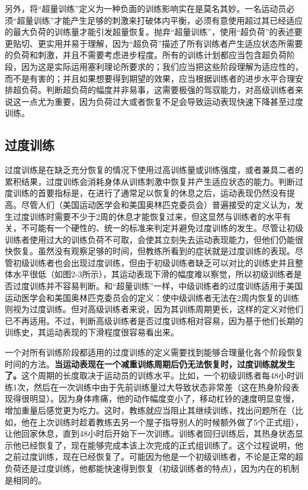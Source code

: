 另外，将“超量训练”定义为一种负面的训练影响实在是莫名其妙。一名运动员必须“超量训练”才能产生足够的刺激来打破体内平衡，必须有意使用超过其已经适应的最大负荷的训练量才能引发超量恢复。抛弃“超量训练”，使用“超负荷”的表述要更贴切、更实用并易于理解，因为“超负荷”描述了所有训练者产生适应状态所需要的负荷和刺激，并且不需要考虑进步程度。所有的训练计划都应当包含超负荷阶段，因为这是实际运用塞利理论所要求的；我们应当把这些阶段理解为适应性的，而不是有害的；并且如果想要得到期望的效果，应当根据训练者的进步水平合理安排超负荷。判断超负荷的幅度并非易事，这需要极强的驾驭能力，对高级训练者来说这一点尤为重要，因为负荷过大或者恢复不足会导致运动表现快速下降甚至过度训练。

\subsection{过度训练}

过度训练是在缺乏充分恢复的情况下使用过高训练量或训练强度，或者兼具二者的累积结果，过度训练会消耗身体从训练刺激中恢复并产生适应状态的能力。判断过度训练的首要指标是，在进行了通常足以恢复的休息之后，运动表现仍然没有提高。尽管人们（美国运动医学会和美国奥林匹克委员会）普遍接受的定义认为，发生过度训练时需要不少于2周的休息才能恢复过来，但这显然与训练者的水平有关，不可能有一个硬性的、统一的标准来判定并避免过度训练的发生。尽管让初级训练者使用过大的训练负荷不可取，会使其立刻失去运动表现能力，但他们仍能很快恢复。虽然没有观察足够的时间，但教练所看到的症状就是过度训练的表现。尽管初级训练者也会出现过度训练，但由于初级训练者缺乏可以对比的训练史并且整体水平很低（如图2-3所示），其运动表现下滑的幅度难以察觉，所以初级训练者是否过度训练并不容易判断。和“超量训练”一样，中级训练者的过度训练适用于美国运动医学会和美国奥林匹克委员会的定义：使中级训练者无法在2周内恢复的训练则视为过度训练。但对高级训练者来说，因为其训练周期更长，这样的定义对他们已不再适用。不过，判断高级训练者是否过度训练相对容易，因为基于他们长期的训练史，其运动表现的下滑程度很容易看出来。

一个对所有训练阶段都适用的过度训练的定义需要找到能够合理量化各个阶段恢复时间的方法。\textbf{当运动表现在一个减重训练周期后仍无法恢复时，过度训练就发生了。}这个周期的长度取决于运动员的训练水平。比如，一个初级训练者每48小时训练1次，然后在一次训练中由于先前训练量过大导致状态非常差（这在热身阶段表现得很明显）。因为身体疼痛，他的动作幅度变小了，移动杠铃的速度明显变慢，增加重量后感觉更为吃力。这时，教练就应当阻止其继续训练，找出问题所在（比如，他在上次训练时趁着教练去另一个屋子指导别人的时候额外做了5个正式组），让他回家休息，直到48小时后开始下一次训练。训练者回归训练后，其热身状态显示他已经恢复了，现在能够完成本该上次完成的正式组训练了。这个过程说明，他之前过度训练，现在已经恢复了。可能因为他是一个初级训练者，不论是正常的超负荷还是过度训练，他都能快速得到恢复（初级训练者的特点），因为内在的机制是相同的。

